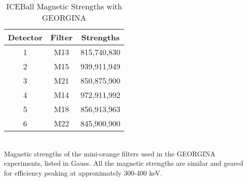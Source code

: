 \begin{table}[]
    \centering
    \caption{ICEBall Magnetic Strengths with GEORGINA}
     \label{tab:ICE_Magnet_G}
    \begin{tabular}{c|c|c} \toprule
         Detector & Filter & Strengths \\
         \hline
         1 & M13 & 815,740,830 \\ 
         2 & M15 & 939,911,949\\
         3 & M21 & 850,875,900 \\
         4 & M14 & 972,911,992\\
         5 & M18 & 856,913,963\\
         6 & M22 & 845,900,900\\ \bottomrule
    \end{tabular}
    \\[2pt]
    \footnotesize
    Magnetic strengths of the mini-orange filters used in the GEORGINA experiments, listed in Gauss. All the magnetic strengths are similar and geared for efficiency peaking at approximately 300-400 keV.
\end{table}